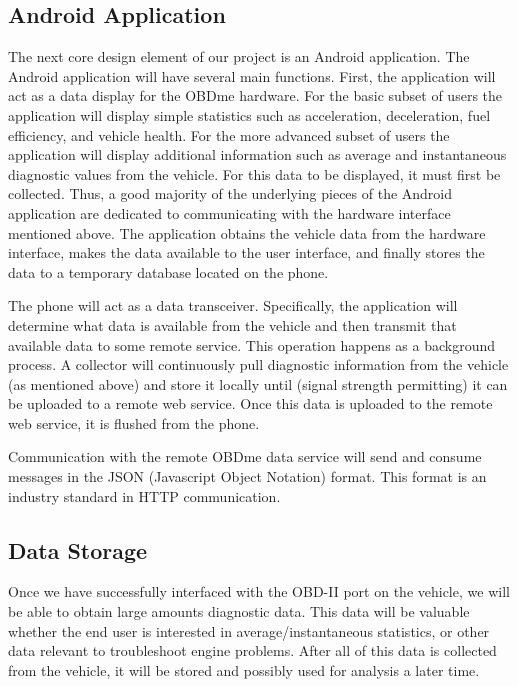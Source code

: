 \documentclass[12pt]{article}
\begin{document}
\subsection{Android Application}\label{subsec:AndroidApplication}

The next core design element of our project is an Android application.  The Android application will have several main functions. First, the application will act as a data display for the OBDme hardware.  For the basic subset of users the application will display simple statistics such as acceleration, deceleration, fuel efficiency, and vehicle health.  For the more advanced subset of users the application will display additional information such as average and instantaneous diagnostic values from the vehicle.  For this data to be displayed, it must first be collected.  Thus, a good majority of the underlying pieces of the Android application are dedicated to communicating with the hardware interface mentioned above.  The application obtains the vehicle data from the hardware interface, makes the data available to the user interface, and finally stores the data to a temporary database located on the phone.

The phone will act as a data transceiver.  Specifically, the application will determine what data is available from the vehicle and then transmit that available data to some remote service.  This operation happens as a background process.  A collector will continuously pull diagnostic information from the vehicle (as mentioned above) and store it locally until (signal strength permitting) it can be uploaded to a remote web service.  Once this data is uploaded to the remote web service, it is flushed from the phone.

Communication with the remote OBDme data service will send and consume messages in the JSON (Javascript Object Notation) format.  This format is an industry standard in HTTP communication.

\subsection{Data Storage}\label{subsec:DataStorage}
Once we have successfully interfaced with the OBD-II port on the vehicle, we will be able to obtain large amounts diagnostic data.  This data will be valuable whether the end user is interested in average/instantaneous statistics, or other data relevant to troubleshoot engine problems.  After all of this data is collected from the vehicle, it will be stored and possibly used for analysis a later time. 
\end{document}
